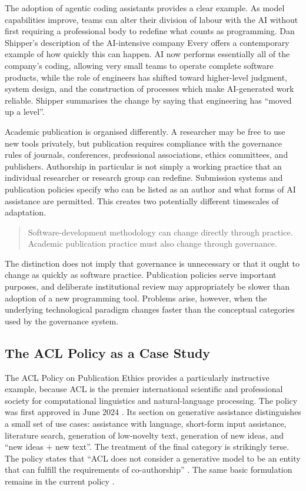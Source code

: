 \documentclass[12pt]{article}
\begin{document}
The adoption of agentic coding assistants provides a clear example. As model capabilities improve, teams can alter their division of labour with the AI without first requiring a professional body to redefine what counts as programming.
Dan Shipper's description of the AI-intensive company Every \citep{newton2026editorclone} offers a contemporary example of how quickly this can happen. AI now performs essentially all of the company's coding, allowing very small teams to operate complete software products, while the role of engineers has shifted toward higher-level judgment, system design, and the construction of processes which make AI-generated work reliable. Shipper summarises the change by saying that engineering has ``moved up a level''.

Academic publication is organised differently.
A researcher may be free to use new tools privately, but publication requires compliance with the governance rules of journals, conferences, professional associations, ethics committees, and publishers. Authorship in particular is not simply a working practice that an individual researcher or research group can redefine. Submission systems and publication policies specify who can be listed as an author and what forms of AI assistance are permitted.
This creates two potentially different timescales of adaptation.
\begin{quote}
Software-development methodology can change directly through practice. Academic publication practice must also change through governance.
\end{quote}
The distinction does not imply that governance is unnecessary or that it ought to change as quickly as software practice. Publication policies serve important purposes, and deliberate institutional review may appropriately be slower than adoption of a new programming tool.
Problems arise, however, when the underlying technological paradigm changes faster than the conceptual categories used by the governance system.


\subsection{The ACL Policy as a Case Study}

The ACL Policy on Publication Ethics provides a particularly instructive example, because ACL is the premier international scientific and professional society for computational linguistics and natural-language processing.
The policy was first approved in June 2024 \citep{acl2024policy}. Its section on generative assistance distinguishes a small set of use cases: assistance with language, short-form input assistance, literature search, generation of low-novelty text, generation of new ideas, and ``new ideas + new text''.
The treatment of the final category is strikingly terse. The policy states that ``ACL does not consider a generative model to be an entity that can fulfill the requirements of co-authorship'' \citep{acl2024policy}. The same basic formulation remains in the current policy \citep{acl2026policy}.
\end{document}
